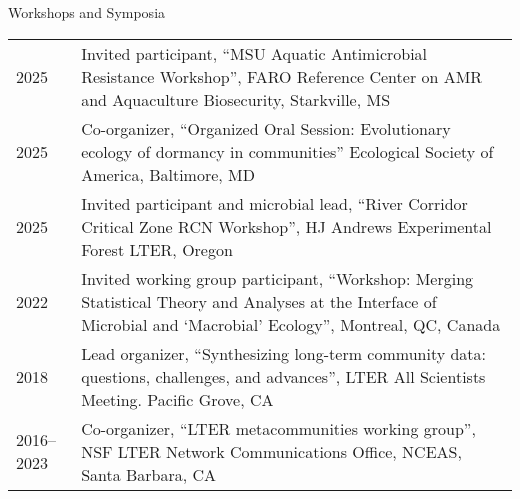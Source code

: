 \documentclass{resume} %
\begin{document}
\bigskip
\begin{rSection}{Workshops and Symposia}
{\def\arraystretch{1}
\begin{xltabular}{\textwidth}{l>{\raggedright\arraybackslash}X}
2025 & Invited participant, ``MSU Aquatic Antimicrobial Resistance Workshop'', FARO Reference Center on AMR and Aquaculture Biosecurity, Starkville, MS\\

2025 & Co-organizer, ``Organized Oral Session: Evolutionary ecology of dormancy in communities'' Ecological Society of America, Baltimore, MD\\

2025 & Invited participant and microbial lead, ``River Corridor Critical Zone RCN Workshop'', HJ Andrews Experimental Forest LTER, Oregon\\

2022 & Invited working group participant, ``Workshop: Merging Statistical Theory and Analyses at the Interface of Microbial and ‘Macrobial’ Ecology'', Montreal, QC, Canada \\

2018 & Lead organizer, ``Synthesizing long-term community data: questions, challenges, and advances'', LTER All Scientists Meeting. Pacific Grove, CA\\

2016--2023 & Co-organizer, ``LTER metacommunities working group'', NSF LTER Network Communications Office, NCEAS, Santa Barbara, CA\\

\end{xltabular}
}
\end{rSection}
\end{document}
